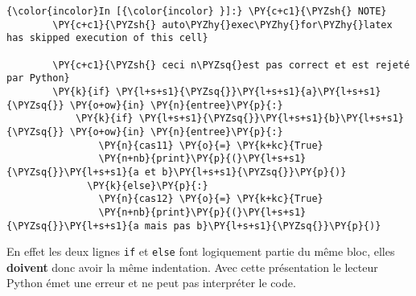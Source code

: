     \begin{Verbatim}[commandchars=\\\{\}]
{\color{incolor}In [{\color{incolor} }]:} \PY{c+c1}{\PYZsh{} NOTE}
        \PY{c+c1}{\PYZsh{} auto\PYZhy{}exec\PYZhy{}for\PYZhy{}latex has skipped execution of this cell}
        
        \PY{c+c1}{\PYZsh{} ceci n\PYZsq{}est pas correct et est rejeté par Python}
        \PY{k}{if} \PY{l+s+s1}{\PYZsq{}}\PY{l+s+s1}{a}\PY{l+s+s1}{\PYZsq{}} \PY{o+ow}{in} \PY{n}{entree}\PY{p}{:}
            \PY{k}{if} \PY{l+s+s1}{\PYZsq{}}\PY{l+s+s1}{b}\PY{l+s+s1}{\PYZsq{}} \PY{o+ow}{in} \PY{n}{entree}\PY{p}{:}
                \PY{n}{cas11} \PY{o}{=} \PY{k+kc}{True}
                \PY{n+nb}{print}\PY{p}{(}\PY{l+s+s1}{\PYZsq{}}\PY{l+s+s1}{a et b}\PY{l+s+s1}{\PYZsq{}}\PY{p}{)}
              \PY{k}{else}\PY{p}{:}
                \PY{n}{cas12} \PY{o}{=} \PY{k+kc}{True}
                \PY{n+nb}{print}\PY{p}{(}\PY{l+s+s1}{\PYZsq{}}\PY{l+s+s1}{a mais pas b}\PY{l+s+s1}{\PYZsq{}}\PY{p}{)}
\end{Verbatim}


    En effet les deux lignes \texttt{if} et \texttt{else} font logiquement
partie du même bloc, elles \textbf{doivent} donc avoir la même
indentation. Avec cette présentation le lecteur Python émet une erreur
et ne peut pas interpréter le code.


    
    
    
